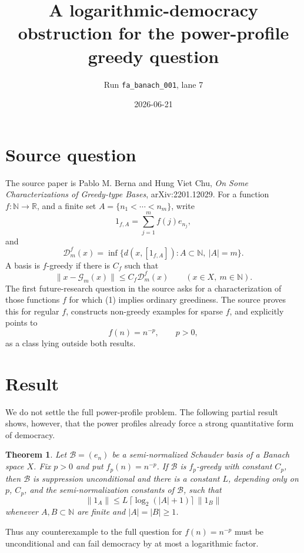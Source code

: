 \documentclass[11pt]{article}
\title{A logarithmic-democracy obstruction for the power-profile greedy question}
\author{Run \texttt{fa\_banach\_001}, lane 7}
\date{2026-06-21}
\newtheorem{theorem}{Theorem}
\theoremstyle{definition}
\newcommand{\N}{\mathbb N}
\newcommand{\calG}{\mathcal G}
\newcommand{\calD}{\mathcal D}
\newcommand{\fp}{f_p}
\begin{document}
\maketitle

\section*{Source question}

The source paper is Pablo M. Berna and Hung Viet Chu,
\emph{On Some Characterizations of Greedy-type Bases}, arXiv:2201.12029.
For a function \(f:\N\to\mathbb R\), and a finite set
\(A=\{n_1<\cdots<n_m\}\), write
\[
        1_{f,A}=\sum_{j=1}^m f(j)e_{n_j},
\]
and
\[
        \calD_m^f(x)=
        \inf\{ d(x,[1_{f,A}]): A\subset\N,\ |A|=m\}.
\]
A basis is \(f\)-greedy if there is \(C_f\) such that
\[
        \|x-\calG_m(x)\|\le C_f \calD_m^f(x)
        \qquad (x\in X,\ m\in\N).
        \tag{1}
\]
The first future-research question in the source asks for a characterization
of those functions \(f\) for which (1) implies ordinary greediness.  The source
proves this for regular \(f\), constructs non-greedy examples for sparse
\(f\), and explicitly points to
\[
        f(n)=n^{-p},\qquad p>0,
\]
as a class lying outside both results.

\section*{Result}

We do not settle the full power-profile problem.  The following partial result
shows, however, that the power profiles already force a strong quantitative
form of democracy.

\begin{theorem}\label{thm:main}
Let \(\mathcal B=(e_n)\) be a semi-normalized Schauder basis of a Banach
space \(X\).  Fix \(p>0\) and put \(\fp(n)=n^{-p}\).  If \(\mathcal B\) is
\(\fp\)-greedy with constant \(C_p\), then \(\mathcal B\) is suppression
unconditional and there is a constant \(L\), depending only on \(p\), \(C_p\),
and the semi-normalization constants of \(\mathcal B\), such that
\[
        \|1_A\|\le L\,\lceil \log_2(|A|+1)\rceil\, \|1_B\|
        \tag{2}
\]
whenever \(A,B\subset\N\) are finite and \(|A|=|B|\ge 1\).
\end{theorem}

Thus any counterexample to the full question for \(f(n)=n^{-p}\) must be
unconditional and can fail democracy by at most a logarithmic factor.
\end{document}
